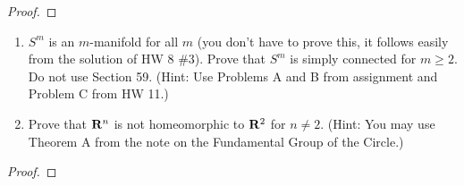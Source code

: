 \begin{proof}
\end{proof}
\newpage
\begin{problem}[C]
\begin{enumerate}[label=(\roman*)]
\item $S^m$ is an $m$-manifold for all $m$ (you don't have to prove this,
  it follows easily from the solution of HW 8 \#3). Prove that $S^m$ is
  simply connected for $m\geq 2$. Do not use Section 59. (Hint: Use
  Problems A and B from assignment and Problem C from HW 11.)
\item Prove that $\mathbf{R}^n$ is not homeomorphic to $\mathbf{R}^2$ for $n\neq
  2$. (Hint: You may use Theorem A from the note on the Fundamental Group
  of the Circle.)
\end{enumerate}
\end{problem}
\begin{proof}
\end{proof}

